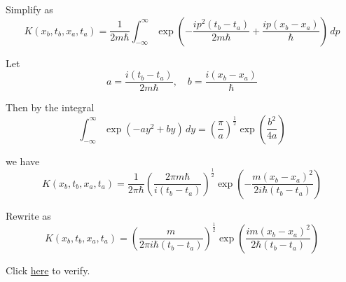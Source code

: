 Simplify as
\begin{equation*}
K(x_b,t_b,x_a,t_a)=\frac{1}{2m\hbar}\int_{-\infty}^\infty
\exp\left(-\frac{ip^2(t_b-t_a)}{2m\hbar}+\frac{ip(x_b-x_a)}{\hbar}\right)\,dp
\end{equation*}

Let
\begin{equation*}
a=\frac{i(t_b-t_a)}{2m\hbar},\quad b=\frac{i(x_b-x_a)}{\hbar}
\end{equation*}

Then by the integral
\begin{equation*}
\int_{-\infty}^\infty
\exp\left(-ay^2+by\right)\,dy=\left(\frac{\pi}{a}\right)^\frac{1}{2}\exp\left(\frac{b^2}{4a}\right)
\end{equation*}

we have
\begin{equation*}
K(x_b,t_b,x_a,t_a)=\frac{1}{2\pi\hbar}
\left(\frac{2\pi m\hbar}{i(t_b-t_a)}\right)^\frac{1}{2}
\exp\left(-\frac{m(x_b-x_a)^2}{2i\hbar(t_b-t_a)}\right)
\end{equation*}

Rewrite as
\begin{equation*}
K(x_b,t_b,x_a,t_a)=
\left(\frac{m}{2\pi i\hbar(t_b-t_a)}\right)^\frac{1}{2}
\exp\left(\frac{im(x_b-x_a)^2}{2\hbar(t_b-t_a)}\right)
\end{equation*}

Click \href{https://georgeweigt.github.io/blog/108.html}{here} to verify.


